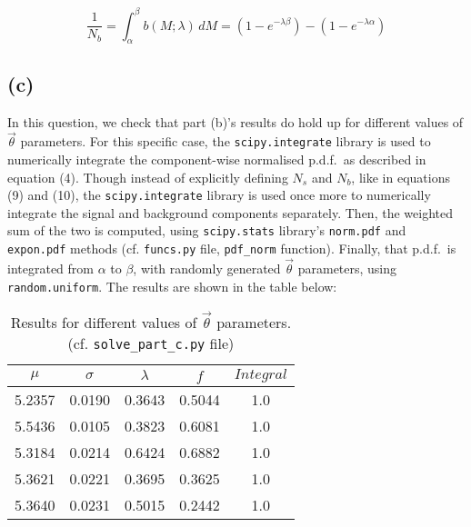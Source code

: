 \documentclass[12pt]{report} %
\begin{document}
\begin{equation}
    \frac{1}{N_{b}} = \int_{\alpha}^{\beta} b(M;\lambda)\, dM = (1 - e^{-\lambda \beta}) - (1 - e^{-\lambda \alpha})
\end{equation}

\subsection*{(c)}

In this question, we check that part (b)'s results do hold up for different values of $\vec{\theta}$ parameters. For this specific case, the \texttt{scipy.integrate} library is used to numerically integrate the component-wise normalised p.d.f.\ as described in equation (4). Though instead of explicitly defining $N_{s}$ and $N_{b}$, like in equations (9) and (10), the \texttt{scipy.integrate} library is used once more to numerically integrate the signal and background components separately. Then, the weighted sum of the two is computed, using \texttt{scipy.stats} library's \texttt{norm.pdf} and \texttt{expon.pdf} methods (cf. \texttt{funcs.py} file, \texttt{pdf\_norm} function). Finally, that p.d.f.\ is integrated from $\alpha$ to $\beta$, with randomly generated $\vec{\theta}$ parameters, using \texttt{random.uniform}. The results are shown in the table below:

\begin{center}
    \begin{table}[htbp]
        \begin{tabular}{ |c|c|c|c|c| } 
            \hline
            $\mu$ & $\sigma$ & $\lambda$ & $f$ & $Integral$ \\ 
            \hline
            5.2357 & 0.0190 & 0.3643 & 0.5044 & 1.0 \\ 
            \hline
            5.5436 & 0.0105 & 0.3823 & 0.6081 & 1.0 \\ 
            \hline
            5.3184 & 0.0214 & 0.6424 & 0.6882 & 1.0 \\ 
            \hline
            5.3621 & 0.0221 & 0.3695 & 0.3625 & 1.0 \\ 
            \hline
            5.3640 & 0.0231 & 0.5015 & 0.2442 & 1.0 \\ 
            \hline
        \end{tabular}
        \centering
        \caption{Results for different values of $\vec{\theta}$ parameters. (cf. \texttt{solve\_part\_c.py} file)}
    \end{table}
\end{center}
\end{document}
